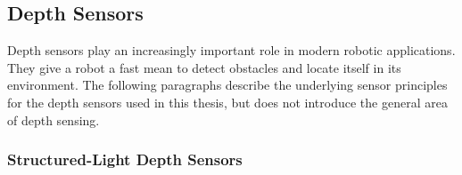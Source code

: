 \subsection{Depth Sensors}

Depth sensors play an increasingly important role in modern robotic applications.
They give a robot a fast mean to detect obstacles and locate itself in its environment.
The following paragraphs describe the underlying sensor principles for the depth sensors used in this thesis, but does not introduce the general area of depth sensing\cite{blais_2003}.

\subsubsection{Structured-Light Depth Sensors}

